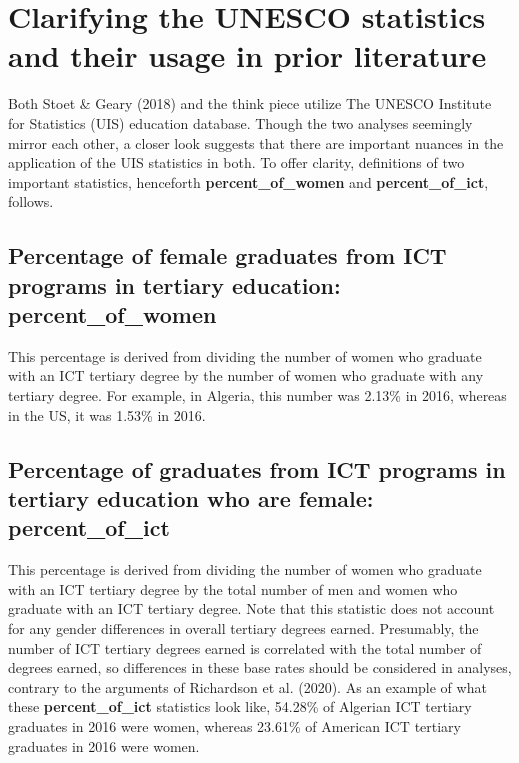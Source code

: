 \documentclass[]{book}
\begin{document}
\section{Clarifying the UNESCO statistics and their usage in prior
literature}\label{clarifying-the-unesco-statistics-and-their-usage-in-prior-literature}

Both Stoet \& Geary (2018) and the think piece utilize The UNESCO
Institute for Statistics (UIS) education database. Though the two
analyses seemingly mirror each other, a closer look suggests that there
are important nuances in the application of the UIS statistics in both.
To offer clarity, definitions of two important statistics, henceforth
\textbf{percent\_of\_women} and \textbf{percent\_of\_ict}, follows.

\subsection{\texorpdfstring{Percentage of female graduates from ICT
programs in tertiary education:
\textbf{percent\_of\_women}}{Percentage of female graduates from ICT programs in tertiary education: percent\_of\_women}}\label{percentage-of-female-graduates-from-ict-programs-in-tertiary-education-percent_of_women}

This percentage is derived from dividing the number of women who
graduate with an ICT tertiary degree by the number of women who graduate
with any tertiary degree. For example, in Algeria, this number was
2.13\% in 2016, whereas in the US, it was 1.53\% in 2016.

\subsection{\texorpdfstring{Percentage of graduates from ICT programs in
tertiary education who are female:
\textbf{percent\_of\_ict}}{Percentage of graduates from ICT programs in tertiary education who are female: percent\_of\_ict}}\label{percentage-of-graduates-from-ict-programs-in-tertiary-education-who-are-female-percent_of_ict}

This percentage is derived from dividing the number of women who
graduate with an ICT tertiary degree by the total number of men and
women who graduate with an ICT tertiary degree. Note that this statistic
does not account for any gender differences in overall tertiary degrees
earned. Presumably, the number of ICT tertiary degrees earned is
correlated with the total number of degrees earned, so differences in
these base rates should be considered in analyses, contrary to the
arguments of Richardson et al. (2020). As an example of what these
\textbf{percent\_of\_ict} statistics look like, 54.28\% of Algerian ICT
tertiary graduates in 2016 were women, whereas 23.61\% of American ICT
tertiary graduates in 2016 were women.
\end{document}

